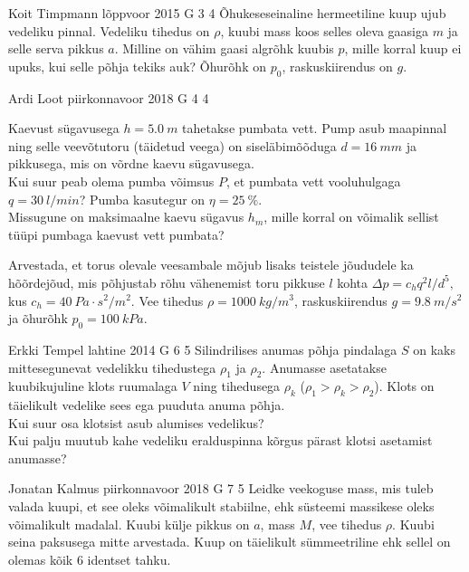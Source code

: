 \documentclass[11pt, twoside]{article}
\begin{document}
{%
{Koit Timpmann} %
{lõppvoor} %
{2015} %
{G 3} %
{4} %
{
\ifStatement
Õhukeseseinaline hermeetiline kuup ujub vedeliku pinnal. Vedeliku tihedus on $\rho$, kuubi mass koos selles oleva gaasiga $m$ ja selle serva pikkus $a$. Milline on vähim gaasi algrõhk kuubis $p$, mille korral kuup ei upuks, kui selle põhja tekiks auk? Õhurõhk on $p_0$, raskuskiirendus on $g$.
\fi
}

{Ardi Loot} %
{piirkonnavoor} %
{2018} %
{G 4} %
{4} %
{
\ifStatement
Kaevust sügavusega $h=\SI{5.0}{m}$ tahetakse pumbata vett. Pump asub
maapinnal ning selle veevõtutoru (täidetud veega) on siseläbimõõduga
$d=\SI{16}{mm}$ ja pikkusega, mis on võrdne kaevu sügavusega.\\
\osa Kui suur peab olema pumba võimsus $P$, et pumbata vett vooluhulgaga
$q=\SI{30}{l/min}$? Pumba kasutegur on $\eta=\SI{25}{\percent}$.\\
\osa Missugune on maksimaalne kaevu sügavus $h_{m}$, mille korral on
võimalik sellist tüüpi pumbaga kaevust vett pumbata?

Arvestada, et torus olevale veesambale mõjub lisaks teistele jõududele
ka hõõrdejõud, mis põhjustab rõhu vähenemist toru pikkuse $l$ kohta $\Delta p=c_{h}q^{2}l/d^{5},$
kus $c_{h}=\SI{40}{Pa\cdot s^{2}/m^{2}}.$ Vee tihedus $\rho=\SI{1000}{kg/m^{3}}$,
raskuskiirendus $g=\SI{9.8}{m/s^{2}}$ ja õhurõhk $p_{0}=\SI{100}{kPa}.$
\fi
}

{Erkki Tempel} %
{lahtine} %
{2014} %
{G 6} %
{5} %
{
\ifStatement
Silindrilises anumas põhja pindalaga $S$ on kaks mittesegunevat vedelikku tihedustega $\rho_1$ ja $\rho_2$. Anumasse asetatakse kuubikujuline klots ruumalaga $V$ ning tihedusega $\rho_k$ ($\rho_1>\rho_k>\rho_2$). Klots on täielikult vedelike sees ega puuduta anuma põhja.\\
\osa Kui suur osa klotsist asub alumises vedelikus?\\
\osa Kui palju muutub kahe vedeliku eralduspinna kõrgus pärast klotsi asetamist anumasse?
\fi
}

{Jonatan Kalmus} %
{piirkonnavoor} %
{2018} %
{G 7} %
{5} %
{
\ifStatement
Leidke veekoguse mass, mis tuleb valada kuupi, et see oleks võimalikult stabiilne, ehk süsteemi massikese oleks võimalikult madalal. Kuubi külje pikkus on $a$, mass $M$, vee tihedus $\rho$. Kuubi seina paksusega mitte arvestada. Kuup on täielikult sümmeetriline ehk sellel on olemas kõik 6 identset tahku.
\fi
}

}
\end{document}
